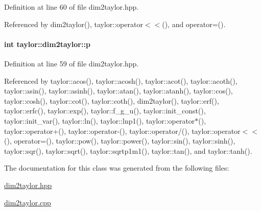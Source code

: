 \-Definition at line 60 of file dim2taylor.\-hpp.



\-Referenced by dim2taylor(), taylor\-::operator$<$$<$(), and operator=().

\hypertarget{classtaylor_1_1dim2taylor_a68bb1d15f4bee8bf2a437d1558c9b28b}{
\paragraph[{p}]{\setlength{\rightskip}{0pt plus 5cm}int {\bf taylor\-::dim2taylor\-::p}}}\label{classtaylor_1_1dim2taylor_a68bb1d15f4bee8bf2a437d1558c9b28b}


\-Definition at line 59 of file dim2taylor.\-hpp.



\-Referenced by taylor\-::acos(), taylor\-::acosh(), taylor\-::acot(), taylor\-::acoth(), taylor\-::asin(), taylor\-::asinh(), taylor\-::atan(), taylor\-::atanh(), taylor\-::cos(), taylor\-::cosh(), taylor\-::cot(), taylor\-::coth(), dim2taylor(), taylor\-::erf(), taylor\-::erfc(), taylor\-::exp(), taylor\-::f\-\_\-g\-\_\-u(), taylor\-::init\-\_\-const(), taylor\-::init\-\_\-var(), taylor\-::ln(), taylor\-::lnp1(), taylor\-::operator$\ast$(), taylor\-::operator+(), taylor\-::operator-\/(), taylor\-::operator/(), taylor\-::operator$<$$<$(), operator=(), taylor\-::pow(), taylor\-::power(), taylor\-::sin(), taylor\-::sinh(), taylor\-::sqr(), taylor\-::sqrt(), taylor\-::sqrtp1m1(), taylor\-::tan(), and taylor\-::tanh().



\-The documentation for this class was generated from the following files\-:\begin{DoxyCompactItemize}
\item 
\hyperlink{dim2taylor_8hpp}{dim2taylor.\-hpp}\item 
\hyperlink{dim2taylor_8cpp}{dim2taylor.\-cpp}\end{DoxyCompactItemize}
